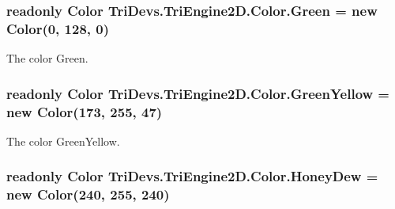 \hypertarget{struct_tri_devs_1_1_tri_engine2_d_1_1_color_a375f93a8f2cd6be6012f4ee49a1dcd70}{
\subsubsection[{Green}]{\setlength{\rightskip}{0pt plus 5cm}readonly {\bf Color} Tri\-Devs.\-Tri\-Engine2\-D.\-Color.\-Green = new {\bf Color}(0, 128, 0)\hspace{0.3cm}{\ttfamily [static]}}}\label{struct_tri_devs_1_1_tri_engine2_d_1_1_color_a375f93a8f2cd6be6012f4ee49a1dcd70}


The color Green. 

\hypertarget{struct_tri_devs_1_1_tri_engine2_d_1_1_color_af6b5c3a3309073b141146c8c57411915}{
\subsubsection[{Green\-Yellow}]{\setlength{\rightskip}{0pt plus 5cm}readonly {\bf Color} Tri\-Devs.\-Tri\-Engine2\-D.\-Color.\-Green\-Yellow = new {\bf Color}(173, 255, 47)\hspace{0.3cm}{\ttfamily [static]}}}\label{struct_tri_devs_1_1_tri_engine2_d_1_1_color_af6b5c3a3309073b141146c8c57411915}


The color Green\-Yellow. 

\hypertarget{struct_tri_devs_1_1_tri_engine2_d_1_1_color_abfafdfb7a773ae3b11dc691b72e576b1}{
\subsubsection[{Honey\-Dew}]{\setlength{\rightskip}{0pt plus 5cm}readonly {\bf Color} Tri\-Devs.\-Tri\-Engine2\-D.\-Color.\-Honey\-Dew = new {\bf Color}(240, 255, 240)\hspace{0.3cm}{\ttfamily [static]}}}\label{struct_tri_devs_1_1_tri_engine2_d_1_1_color_abfafdfb7a773ae3b11dc691b72e576b1}


